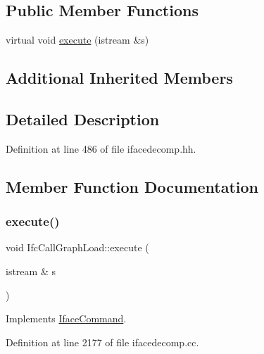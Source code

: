 \subsection*{Public Member Functions}
\begin{DoxyCompactItemize}
\item 
virtual void \mbox{\hyperlink{class_ifc_call_graph_load_acbec76d28fb6e2027a3101c33fde7435}{execute}} (istream \&s)
\end{DoxyCompactItemize}
\subsection*{Additional Inherited Members}


\subsection{Detailed Description}


Definition at line 486 of file ifacedecomp.\+hh.



\subsection{Member Function Documentation}
\mbox{\label{class_ifc_call_graph_load_acbec76d28fb6e2027a3101c33fde7435}} 
\subsubsection{\texorpdfstring{execute()}{execute()}}
{\footnotesize\ttfamily void Ifc\+Call\+Graph\+Load\+::execute (\begin{DoxyParamCaption}\item[{istream \&}]{s }\end{DoxyParamCaption})\hspace{0.3cm}{\ttfamily [virtual]}}



Implements \mbox{\hyperlink{class_iface_command_af10e29cee2c8e419de6efe9e680ad201}{Iface\+Command}}.



Definition at line 2177 of file ifacedecomp.\+cc.


